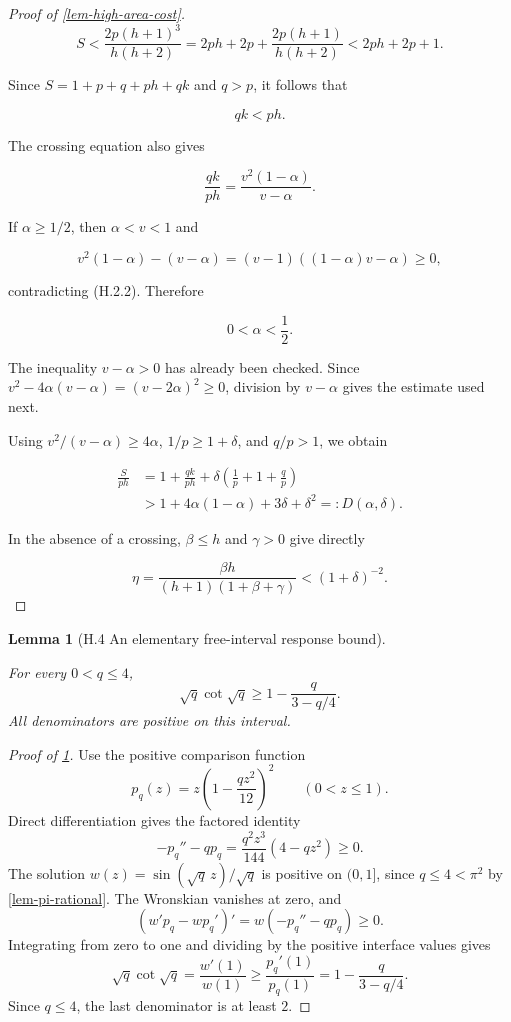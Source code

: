 \documentclass[11pt,a4paper]{article}
\theoremstyle{proofmanuscript}
\newtheorem{lemma}[theorem]{Lemma}
\begin{document}
\begin{proof}[Proof of \ref{lem-high-area-cost}]
\[
S<\frac{2p(h+1)^3}{h(h+2)}
=2ph+2p+\frac{2p(h+1)}{h(h+2)}<2ph+2p+1.
\]

Since \(S=1+p+q+ph+qk\) and \(q>p\), it follows that

\[
qk<ph.
\tag{H.2.2}
\]

The crossing equation also gives

\[
\frac{qk}{ph}=\frac{v^2(1-\alpha)}{v-\alpha}.
\tag{H.2.3}
\]

If \(\alpha\ge1/2\), then \(\alpha<v<1\) and

\[
v^2(1-\alpha)-(v-\alpha)
=(v-1)((1-\alpha)v-\alpha)\ge0,
\]

contradicting (H.2.2). Therefore

\[
0<\alpha<\frac12.
\tag{H.2.4}
\]

The inequality \(v-\alpha>0\) has already been checked. Since \(v^2-4\alpha(v-\alpha)=(v-2\alpha)^2\ge0\), division by \(v-\alpha\) gives the estimate used next.

Using \(v^2/(v-\alpha)\ge4\alpha\), \(1/p\ge1+\delta\), and \(q/p>1\), we obtain

\[
\begin{aligned}
\frac S{ph}
&=1+\frac{qk}{ph}+\delta\left(\frac1p+1+\frac qp\right)\\
&>1+4\alpha(1-\alpha)+3\delta+\delta^2
=:D(\alpha,\delta).
\end{aligned}
\tag{H.2.5}
\]

In the absence of a crossing, \(\beta\le h\) and \(\gamma>0\) give directly

\[
\eta=\frac{\beta h}{(h+1)(1+\beta+\gamma)}
<(1+\delta)^{-2}.
\tag{H.2.6}
\]

\end{proof}

\begin{lemma}[H.4 An elementary free-interval response bound]\label{lem-free-sturm-bound}

For every \(0<q\le4\), \[
\sqrt q\cot\sqrt q\ge1-\frac{q}{3-q/4}.
\tag{H.4.1}
\] All denominators are positive on this interval.

\end{lemma}

\begin{proof}[Proof of \ref{lem-free-sturm-bound}]

Use the positive comparison function \[
p_q(z)=z\left(1-\frac{qz^2}{12}\right)^2
\qquad(0<z\le1).
\] Direct differentiation gives the factored identity \[
-p_q''-qp_q=\frac{q^2z^3}{144}(4-qz^2)\ge0.
\tag{H.4.2}
\] The solution \(w(z)=\sin(\sqrt q\,z)/\sqrt q\) is positive on \((0,1]\), since \(q\le4<\pi^2\) by \ref{lem-pi-rational}. The Wronskian vanishes at zero, and \[
(w'p_q-wp_q')'=w(-p_q''-qp_q)\ge0.
\] Integrating from zero to one and dividing by the positive interface values gives \[
\sqrt q\cot\sqrt q=\frac{w'(1)}{w(1)}
\ge\frac{p_q'(1)}{p_q(1)}
=1-\frac{q}{3-q/4}.
\] Since \(q\le4\), the last denominator is at least \(2\).

\end{proof}
\end{document}
